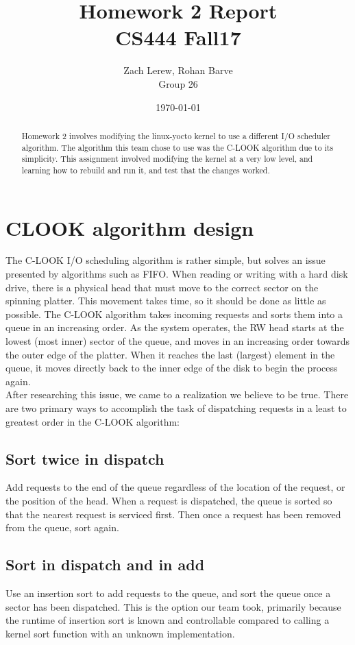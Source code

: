 \documentclass[letterpaper,10pt,fleqn]{article}
\title{Homework 2 Report\\\large CS444 Fall17}
\author{Zach Lerew, Rohan Barve\\\large Group 26}
\date{\today}
\begin{document}
	\begin{titlingpage}
		\maketitle
		\begin{abstract}
			\noindent Homework 2 involves modifying the linux-yocto kernel to use a different I/O scheduler algorithm.
			The algorithm this team chose to use was the C-LOOK algorithm due to its simplicity.
			This assignment involved modifying the kernel at a very low level, and learning how to rebuild and run it, and test that the changes worked.
		\end{abstract}
	\end{titlingpage}


	\section*{CLOOK algorithm design}
	The C-LOOK I/O scheduling algorithm is rather simple, but solves an issue presented by algorithms such as FIFO. When reading or writing with a hard disk drive, there is a physical head that must move to the correct sector on the spinning platter.
	This movement takes time, so it should be done as little as possible. The C-LOOK algorithm takes incoming requests and sorts them into a queue in an increasing order.
	As the system operates, the RW head starts at the lowest (most inner) sector of the queue, and moves in an increasing order towards the outer edge of the platter.
	When it reaches the last (largest) element in the queue, it moves directly back to the inner edge of the disk to begin the process again.
	\\After researching this issue, we came to a realization we believe to be true. There are two primary ways to accomplish the task of dispatching requests in a least to greatest order in the C-LOOK algorithm:
	\subsection{Sort twice in dispatch}
	Add requests to the end of the queue regardless of the location of the request, or the position of the head. When a request is dispatched, the queue is sorted so that the nearest request is serviced first. Then once a request has been removed from the queue, sort again.
	\subsection{Sort in dispatch and in add}
	Use an insertion sort to add requests to the queue, and sort the queue once a sector has been dispatched.
	This is the option our team took, primarily because the runtime of insertion sort is known and controllable compared to calling a kernel sort function with an unknown implementation.
\end{document}
